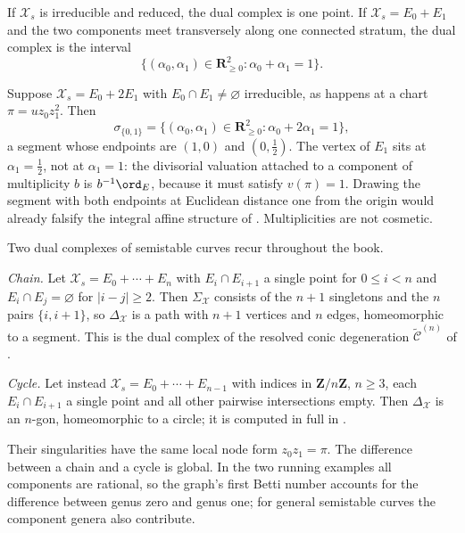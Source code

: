 \begin{example}
\label{ex:dual-complex-first}
If $\mathcal X_s$ is irreducible and reduced, the dual complex is one
point. If $\mathcal X_s=E_0+E_1$ and the two components meet transversely
along one connected stratum, the dual complex is the interval
\[
        \{(\alpha_0,\alpha_1)\in\mathbf R_{\geq0}^2:
                          \alpha_0+\alpha_1=1\}.
\]
\end{example}

\begin{example}
\label{ex:dual-complex-multiplicities}
Suppose $\mathcal X_s=E_0+2E_1$ with $E_0\cap E_1\neq\varnothing$
irreducible, as happens at a chart $\pi=uz_0z_1^2$. Then
\[
  \sigma_{\{0,1\}}
  =\{(\alpha_0,\alpha_1)\in\mathbf R_{\geq0}^2:
       \alpha_0+2\alpha_1=1\},
\]
a segment whose endpoints are $(1,0)$ and $(0,\tfrac12)$. The vertex of
$E_1$ sits at $\alpha_1=\tfrac12$, not at $\alpha_1=1$: the divisorial
valuation attached to a component of multiplicity $b$ is
$b^{-1}\ord_E$, because it must satisfy $v(\pi)=1$. Drawing the segment
with both endpoints at Euclidean distance one from the origin would already
falsify the integral affine structure of
. Multiplicities are not cosmetic.
\end{example}

\begin{example}
\label{ex:dual-complex-chain-cycle}
Two dual complexes of semistable curves recur throughout the book.

\emph{Chain.} Let $\mathcal X_s=E_0+\cdots+E_n$ with $E_i\cap
E_{i+1}$ a single point for $0\le i<n$ and $E_i\cap E_j=\varnothing$
for $|i-j|\ge2$. Then $\Sigma_{\mathcal X}$ consists of the $n+1$
singletons and the $n$ pairs $\{i,i+1\}$, so $\Delta_{\mathcal X}$ is
a path with $n+1$ vertices and $n$ edges, homeomorphic to a segment.
This is the dual complex of the resolved conic degeneration
$\widetilde{\mathcal C}^{(n)}$ of .

\emph{Cycle.} Let instead $\mathcal X_s=E_0+\cdots+E_{n-1}$ with indices
in $\mathbf Z/n\mathbf Z$, $n\ge3$, each $E_i\cap E_{i+1}$ a single
point and all other pairwise intersections empty. Then
$\Delta_{\mathcal X}$ is an $n$-gon, homeomorphic to a circle; it is
computed in full in .

Their singularities have the same local node form $z_0z_1=\pi$.
The difference between a chain and a cycle is global. In the two running
examples all components are rational, so the graph's first Betti number
accounts for the difference between genus zero and genus one; for general
semistable curves the component genera also contribute.
\end{example}

